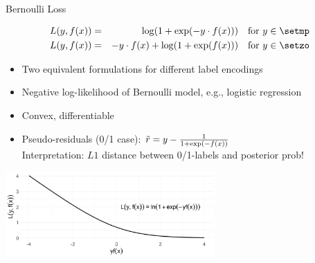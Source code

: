 \begin{vbframe}{Bernoulli Loss}

\vspace*{-0.5cm}
\begin{eqnarray*}
  L(y, \fx) &=& \log(1+\exp(-y \cdot \fx)) \quad \text{for } y \in \setmp\\
  L(y, \fx) &=& - y \cdot \fx + \log(1 + \exp(\fx)) \quad \text{for } y \in \setzo 
\end{eqnarray*}

\begin{itemize}
  \item Two equivalent formulations for different label encodings
  \item Negative log-likelihood of Bernoulli model, e.g., logistic regression
  \item Convex, differentiable
  \item Pseudo-residuals (0/1 case): $\tilde{r} = y - \frac{1}{1+\exp(-f(x))}$\\   
    Interpretation: $L1$ distance between 0/1-labels and posterior prob!
\end{itemize}

\vspace{0.2cm}
\begin{center}
\includegraphics[width = 8cm ]{figure/plot_bernoulli_plusmin_encoding.png}
\end{center}

\end{vbframe}




